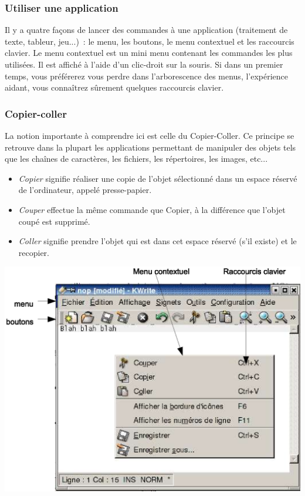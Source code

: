 \documentclass[12pt,a4paper]{article}
\begin{document}
\subsubsection{Utiliser une application}

Il y a quatre façons de lancer des commandes à une application
(traitement de texte, tableur, jeu...)~: 
le menu, les boutons, le menu contextuel et les raccourcis clavier. Le
menu contextuel est un mini menu contenant les commandes les plus
utilisées. Il est affiché à l'aide d'un clic-droit sur la souris. 
Si dans un premier temps, vous préférerez vous perdre dans
l'arborescence des menus, l'expérience aidant, vous connaîtrez
sûrement quelques raccourcis clavier. 

\subsubsection{Copier-coller}
La notion importante à comprendre ici est celle du Copier-Coller. Ce
principe se retrouve dans la plupart les applications permettant de
manipuler des objets tels que les chaînes de caractères, les fichiers,
les répertoires, les images, etc... 

\begin{itemize}
\item \emph{Copier} signifie réaliser une copie de l'objet sélectionné
  dans un espace réservé de l'ordinateur, appelé presse-papier.
\item \emph{Couper} effectue la même commande que Copier, à la différence que
  l'objet coupé est supprimé.
\item \emph{Coller} signifie prendre l'objet qui est dans cet espace réservé
  (s'il existe) et le recopier.
\end{itemize}


\begin{center}
  \includegraphics{img/kwrite.eps}
\end{center}
\end{document}
